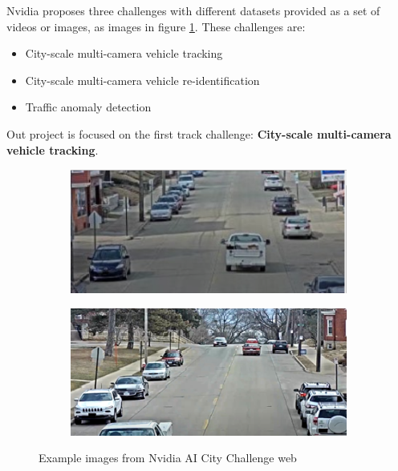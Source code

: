 \documentclass[journal, a4paper]{IEEEtran}
\begin{document}
Nvidia proposes three challenges with different datasets provided as a set of videos or images, as images in figure \ref{fig:nvidiaImages}. These challenges are: 

\begin{itemize}
\item City-scale multi-camera vehicle tracking
\item City-scale multi-camera vehicle re-identification
\item Traffic anomaly detection 
\end{itemize}

Out project is focused on the first track challenge:  \textbf{City-scale multi-camera vehicle tracking}.

\begin{figure}[ht] \centering
\begin{subfigure}[b]{0.22\textwidth}
\includegraphics[scale=.5]{images/nvidia1.png}   
\end{subfigure}
\hspace{0.2cm}
\begin{subfigure}[b]{0.22\textwidth}
\includegraphics[scale=.5]{images/nvidia2.png}   
\end{subfigure}
\caption{\label{fig:nvidiaImages} Example images from Nvidia AI City Challenge web}
\end{figure}
\end{document}
